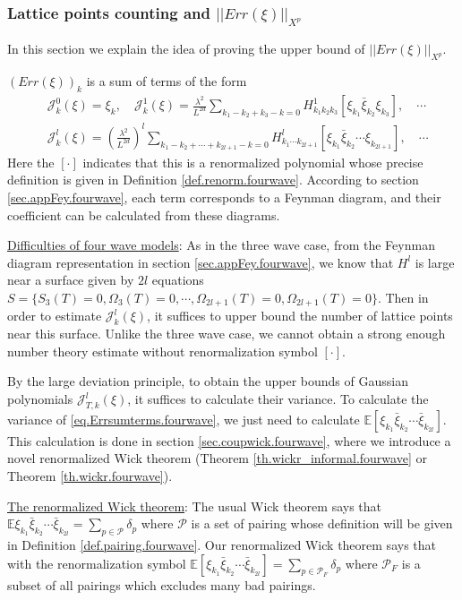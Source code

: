 \subsubsection{Lattice points counting and $||Err(\xi)||_{X^p}$}\label{sec.latticeintro.fourwave} In this section we explain the idea of proving the upper bound of $||Err(\xi)||_{X^p}$.

$(Err(\xi))_{k}$ is a sum of terms of the form
\begin{equation}\label{eq.Errsumterms.fourwave}
\begin{split}
 &\mathcal{J}_k^0(\xi)= \xi_k, \quad \mathcal{J}_k^1(\xi)=\frac{\lambda^2}{L^{2d}} \sum_{k_1-k_2+k_3-k=0} H^1_{k_1k_2k_3} [\xi_{k_1}\bar{\xi}_{k_2}\xi_{k_3}] , \quad\cdots \\
 &\mathcal{J}_k^l(\xi)=\left(\frac{\lambda^2}{L^{2d}}\right)^l\sum_{k_1-k_2+\cdots+k_{2l+1}-k=0} H^l_{k_1\cdots k_{2l+1}} [\xi_{k_1}\bar{\xi}_{k_2}\cdots\xi_{k_{2l+1}}], \quad\cdots 
\end{split}
\end{equation}
Here the $[\cdot]$ indicates that this is a renormalized polynomial whose precise definition is given in Definition \ref{def.renorm.fourwave}. According to section \ref{sec.appFey.fourwave}, each term corresponds to a Feynman diagram, and their coefficient can be calculated from these diagrams. 

\underline{Difficulties of four wave models}: As in the three wave case, from the Feynman diagram representation in section \ref{sec.appFey.fourwave}, we know that $H^l$ is large near a surface given by $2l$ equations $S=\{S_{3}(T)=0,\Omega_{3}(T)=0,\cdots,\Omega_{2l+1}(T)=0,\Omega_{2l+1}(T)=0\}$. Then in order to estimate $\mathcal{J}_k^l(\xi)$, it suffices to upper bound the number of lattice points near this surface. Unlike the three wave case, we cannot obtain a strong enough number theory estimate without renormalization symbol $[\cdot]$.



By the large deviation principle, to obtain the upper bounds of Gaussian polynomials $\mathcal{J}_{T,k}^l(\xi)$, it suffices to calculate their variance. To calculate the variance of \eqref{eq.Errsumterms.fourwave}, we just need to calculate $\mathbb{E}[\xi_{k_1}\bar{\xi}_{k_2}\cdots\bar{\xi}_{k_{2l}}]$. This calculation is done in section \ref{sec.coupwick.fourwave}, where we introduce a novel renormalized Wick theorem (Theorem \ref{th.wickr_informal.fourwave} or Theorem \ref{th.wickr.fourwave}).

\underline{The renormalized Wick theorem}: The usual Wick theorem says that $\mathbb{E}\xi_{k_1}\bar{\xi}_{k_2}\cdots\bar{\xi}_{k_{2l}}=\sum_{p\in \mathcal{P}}\delta_p$ where $\mathcal{P}$ is a set of pairing whose definition will be given in Definition \ref{def.pairing.fourwave}. Our renormalized Wick theorem says that with the renormalization symbol $\mathbb{E}[\xi_{k_1}\bar{\xi}_{k_2}\cdots\bar{\xi}_{k_{2l}}]=\sum_{p\in \mathcal{P}_F}\delta_p$ where $\mathcal{P}_F$ is a subset of all pairings which excludes many bad pairings.

